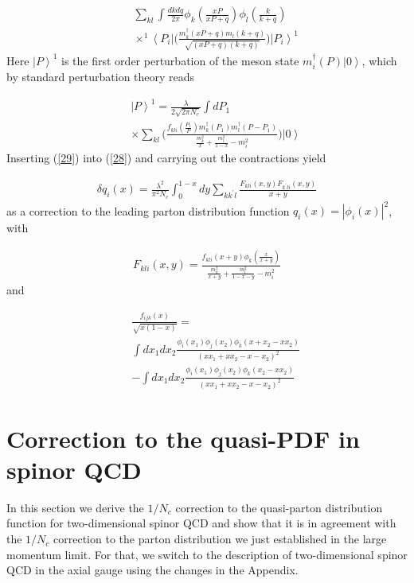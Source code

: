 \documentclass[showpacs,twocolumn,aps,preprintnumbers,letterpaper]{revtex4}
\newcommand{\be}{\begin{equation}}
\newcommand{\ee}{\end{equation}}
\def\be{\begin{eqnarray}}
\def\ee{\end{eqnarray}}
\begin{document}
\be
\label{28}
&&\sum_{kl}\int \frac{dk dq}{2\pi}\phi _{k}\left(\frac{xP}{xP+q}\right)\phi_{l}\left(\frac{k}{k+q}\right)\nonumber \\ 
&&\times ^{1}\left<P_i\right|\bigg(\frac{m_{k}^{\dagger}(xP+q)m_{l}(k+q)}{\sqrt{(xP+q)(k+q)}}\bigg)\left|P_i\right>^{1}
\ee
Here $\left|P\right>^{1}$ is the first order perturbation of the meson state $m_{i}^{\dagger}(P)\left|0\right>$, 
which by standard perturbation theory reads


\be
\label{29}
&&\left|P\right>^{1}=\frac{\lambda}{2 \sqrt{2\pi N_c}}\int dP_1 \nonumber\\
&&\times \sum_{kl}
\bigg(\frac{f_{kli}(\frac{P_1}{P})m_{k}^{\dagger}(P_1)m_{l}^{\dagger}(P-P_1)}{\frac{m_k^2}{x}+\frac{m_l^2}{1-x}-m_i^2}\bigg)
\left|0\right>
\ee
Inserting (\ref{29}) into (\ref{28}) and carrying out the contractions yield 

\be
\label{30}
\delta q_i(x)=\frac{\lambda^2}{\pi^2 N_c}\int_0^{1-x}dy\sum_{kk^{\prime}l}\frac{F_{kli}(x,y)F_{k^{\prime }li}(x,y)}{x+y}
\ee
as a correction to the leading parton distribution function $q_i(x)=|\phi_i(x)|^2$, with 

\be
\label{31}
F_{kli}(x,y)=\frac{f_{kli}(x+y)\phi_k(\frac{x}{x+y})}{\frac{m_k^2}{x+y}+\frac{m_l^2}{1-x-y}-m_i^2}
\ee
and

\be
\label{32}
&&\frac{f_{ijk}(x)}{\sqrt{x(1-x)}}=\nonumber \\ 
&&\int dx_1 dx_2\frac{\phi_i(x_1)\phi_j(x_2)\phi_k(x+x_2-xx_2)}{(xx_1+xx_2-x-x_2)^2} \nonumber \\
&&-\int dx_1 dx_2\frac{\phi_i(x_1)\phi_j(x_2)\phi_k(x_2-xx_2)}{(xx_1+xx_2-x-x_2)^2} 
\ee















\section{Correction to the quasi-PDF in spinor QCD}

In this section we derive the $1/N_c$ correction to the quasi-parton distribution function for two-dimensional
spinor QCD and show that it is in agreement with the $1/N_c$ correction to the parton distribution we just
established in the large momentum limit. For  that, we switch to the description of two-dimensional spinor
QCD in the axial gauge using the changes in the Appendix. 
\end{document}

